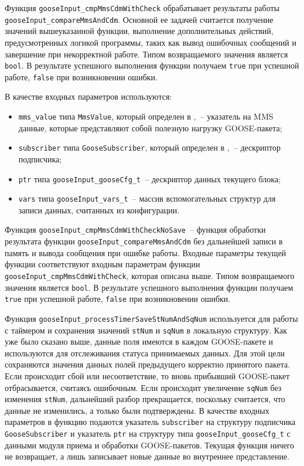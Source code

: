 Функция \lstinline{gooseInput_cmpMmsCdmWithCheck} обрабатывает результаты работы \lstinline{gooseInput_compareMmsAndCdm}. Основной ее задачей считается
получение значений вышеуказанной функции, выполнение дополнительных действий, предусмотренных логикой программы, таких как вывод ошибочных сообщений и завершение при некорректной работе. Типом возвращаемого значения является \lstinline{bool}. В результате успешного выполнения функции получаем \lstinline{true} при успешной работе, \lstinline{false} при возникновении ошибки.

В качестве входных параметров используются:

\begin{itemize}
    \item \lstinline{mms_value} типа \lstinline{MmsValue}, который определен в \libIec,~-- указатель на MMS данные, которые представляют собой полезную нагрузку GOOSE-пакета;
    \item \lstinline{subscriber} типа \lstinline{GooseSubscriber}, который определен в \libIec,~-- дескриптор подписчика;
    \item \lstinline{ptr} типа \lstinline{gooseInput_gooseCfg_t}~-- дескриптор данных текущего блока;
    \item \lstinline{vars} типа \lstinline{gooseInput_vars_t}~-- массив вспомогательных структур для записи данных, считанных из конфигурации.
\end{itemize}

Функция \lstinline{gooseInput_cmpMmsCdmWithCheckNoSave}~-- функция обработки результата функции \lstinline{gooseInput_compareMmsAndCdm} без дальнейшей записи в память и вывода сообщения при ошибке работы. Входные параметры текущей функции соответствуют входным параметрам функции \lstinline{gooseInput_cmpMmsCdmWithCheck},
которая описана выше. Типом возвращаемого значения является \lstinline{bool}. В результате успешного выполнения функции получаем \lstinline{true} при успешной работе, \lstinline{false} при возникновении ошибки.

Функция \lstinline{gooseInput_processTimerSaveStNumAndSqNum} используется для работы с таймером и сохранения значений \lstinline{stNum} и \lstinline{sqNum} в локальную структуру.
Как уже было сказано выше, данные поля имеются в каждом GOOSE-пакете и используются для отслеживания статуса принимаемых данных.
Для этой цели сохраняются значения данных полей предыдущего корректно принятого пакета. Если происходит сбой или несоответствие, то вновь прибывший GOOSE-пакет отбрасывается, считаясь ошибочным.
Если происходит увеличение \lstinline{sqNum} без изменения \lstinline{stNum},
дальнейший разбор прекращается, поскольку считается, что данные не изменились, а
только были подтверждены.
В качестве входных параметров в функцию подаются указатель \lstinline{subscriber} на структуру подписчика \lstinline{GooseSubscriber} и указатель \lstinline{ptr} на структуру
типа \lstinline{gooseInput_gooseCfg_t} с данными модуля приема и обработки GOOSE-пакетов. Текущая функция ничего не возвращает, а лишь записывает новые данные во внутреннее представление.

